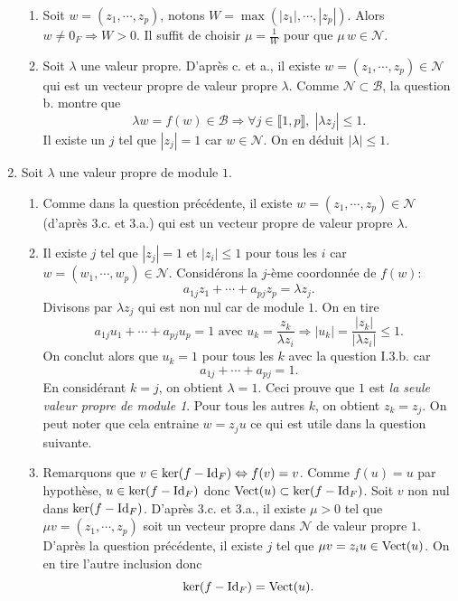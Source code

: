 \begin{enumerate}
\begin{enumerate}
     \item Soit $w=(z_1,\cdots,z_p)$, notons $W = \max(|z_1|,\cdots,|z_p|)$. Alors $w\neq 0_F \Rightarrow W >0$. Il suffit de choisir $\mu = \frac{1}{W}$ pour que $\mu\,w \in \mathcal{N}$.
     
     \item Soit $\lambda$ une valeur propre. D'après c. et a., il existe $w =(z_1, \cdots, z_p) \in \mathcal{N}$ qui est un vecteur propre de valeur propre $\lambda$. Comme $\mathcal{N} \subset \mathcal{B}$, la question b. montre que 
\[
  \lambda w = f(w) \in \mathcal{B} \Rightarrow \forall j \in \llbracket 1,p \rrbracket,\; |\lambda z_j| \leq 1.
\]
Il existe un $j$ tel que $|z_j| = 1$ car $w \in \mathcal{N}$. On en déduit $|\lambda| \leq 1$.
  \end{enumerate}

  \item Soit $\lambda$ une valeur propre de module $1$.
    \begin{enumerate}
      \item Comme dans la question précédente, il existe $w =(z_1, \cdots, z_p) \in \mathcal{N}$ (d'après 3.c. et 3.a.) qui est un vecteur propre de valeur propre $\lambda$. 
      
      \item Il existe $j$ tel que $|z_j| = 1$ et $|z_i|\leq 1$ pour tous les $i$ car $w=(w_1,\cdots,w_p) \in \mathcal{N}$. Considérons la $j$-ème coordonnée de $f(w)$:
\[
 a_{1 j}z_1 + \cdots + a_{p j} z_p = \lambda z_j.
\]
Divisons par $\lambda z_j$ qui est non nul car de module $1$. On en tire
\[
 a_{1 j}u_1 + \cdots + a_{p j} u_p = 1
 \text{ avec }
 u_k = \frac{z_k}{\lambda z_i} \Rightarrow |u_k| = \frac{|z_k|}{|\lambda z_i|} \leq 1.
\]
On conclut alors que $u_k = 1$ pour tous les $k$ avec la question I.3.b. car 
\[
  a_{1 j} + \cdots + a_{p j} = 1.
\]
En considérant $k =j$, on obtient $\lambda = 1$. Ceci prouve que $1$ est \emph{la seule valeur propre de module 1}. Pour tous les autres $k$, on obtient $z_k = z_j$.\newline
On peut noter que cela entraine $w = z_j u$ ce qui est utile dans la question suivante.
      
      \item  Remarquons que $v\in  \ker (f-\operatorname{Id}_F) \Leftrightarrow f(v)=v$. Comme $f(u)=u$ par hypothèse, $u\in  \ker (f-\operatorname{Id}_F)$ donc $\operatorname{Vect}(u)\subset  \ker (f-\operatorname{Id}_F)$.\newline
Soit $v$ non nul dans $\ker (f-\operatorname{Id}_F)$. D'après 3.c. et 3.a., il existe $\mu >0$ tel que $\mu v = (z_1, \cdots, z_p)$ soit un vecteur propre dans $\mathcal{N}$ de valeur propre $1$. D'après la question précédente, il existe $j$ tel que $\mu v = z_i u \in \operatorname{Vect}(u)$. On en tire l'autre inclusion donc
\[
 \ker(f-\operatorname{Id}_F) = \operatorname{Vect}(u).
\]
 \end{enumerate}
\end{enumerate}



